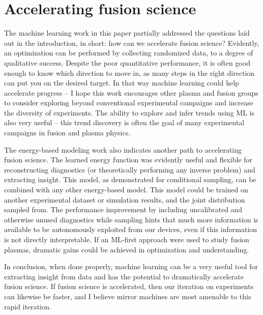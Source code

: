 \section{Accelerating fusion science}

The machine learning work in this paper partially addressed the questions laid out in the introduction, in short: how can we accelerate fusion science? Evidently, an optimization can be performed by collecting randomized data, to a degree of qualitative success. Despite the poor quantitative performance, it is often good enough to know which direction to move in, as many steps in the right direction can put you on the desired target. In that way machine learning could help accelerate progress -- I hope this work encourages other plasma and fusion groups to consider exploring beyond conventional experimental campaigns and increase the diversity of experiments. The ability to explore and infer trends using ML is also very useful -- this trend discovery is often the goal of many experimental campaigns in fusion and plasma physics. 

The energy-based modeling work also indicates another path to accelerating fusion science. The learned energy function was evidently useful and flexible for reconstructing diagnostics (or theoretically performing any inverse problem) and extracting insight. This model, as demonstrated for conditional sampling, can be combined with any other energy-based model. This model could be trained on another experimental dataset or simulation results, and the joint distribution sampled from. The performance improvement by including uncalibrated and otherwise unused diagnostics while sampling hints that much more information is available to be autonomously exploited from our devices, even if this information is not directly interpretable. If an ML-first approach were used to study fusion plasmas, dramatic gains could be achieved in optimization and understanding. 

In conclusion, when done properly, machine learning can be a very useful tool for extracting insight from data and has the potential to dramatically accelerate fusion science. If fusion science is accelerated, then our iteration on experiments can likewise be faster, and I believe mirror machines are most amenable to this rapid iteration.



























